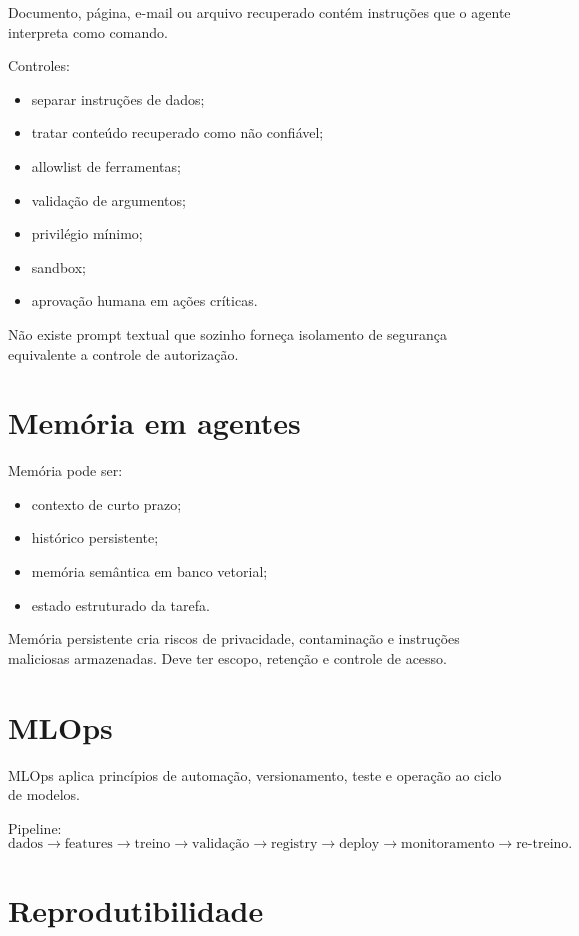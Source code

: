 Documento, página, e-mail ou arquivo recuperado contém instruções que o agente interpreta como comando.

Controles:
\begin{itemize}
\item separar instruções de dados;
\item tratar conteúdo recuperado como não confiável;
\item allowlist de ferramentas;
\item validação de argumentos;
\item privilégio mínimo;
\item sandbox;
\item aprovação humana em ações críticas.
\end{itemize}

Não existe prompt textual que sozinho forneça isolamento de segurança equivalente a controle de autorização.

\section{Memória em agentes}

Memória pode ser:
\begin{itemize}
\item contexto de curto prazo;
\item histórico persistente;
\item memória semântica em banco vetorial;
\item estado estruturado da tarefa.
\end{itemize}

Memória persistente cria riscos de privacidade, contaminação e instruções maliciosas armazenadas. Deve ter escopo, retenção e controle de acesso.

\section{MLOps}

MLOps aplica princípios de automação, versionamento, teste e operação ao ciclo de modelos.

Pipeline:
\[
\text{dados}
\rightarrow
\text{features}
\rightarrow
\text{treino}
\rightarrow
\text{validação}
\rightarrow
\text{registry}
\rightarrow
\text{deploy}
\rightarrow
\text{monitoramento}
\rightarrow
\text{re-treino}.
\]

\section{Reprodutibilidade}

